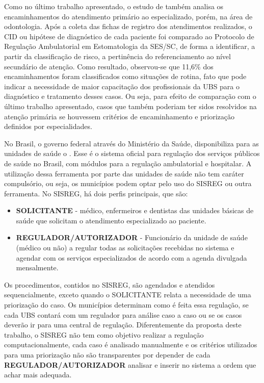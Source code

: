 Como no último trabalho apresentado, o estudo de  também analisa os encaminhamentos do atendimento primário ao especializado, porém, na área de odontologia. Após a coleta das fichas de registro dos atendimentos realizados, o CID ou hipótese de diagnóstico de cada paciente foi comparado ao Protocolo de Regulação Ambulatorial em Estomatologia da SES/SC, de forma a identificar, a partir da classificação de risco, a pertinência do referenciamento ao nível secundário de atenção. Como resultado, observou-se que  11,6\% dos encaminhamentos foram classificados como situações de rotina, fato que pode indicar a necessidade de maior capacitação dos profissionais da UBS para o diagnóstico e tratamento desses casos. Ou seja, para efeito de comparação com o último trabalho apresentado, casos que também poderiam ter sidos resolvidos na atenção primária se houvessem critérios de encaminhamento e priorização definidos por especialidades.

No Brasil, o governo federal através do Ministério da Saúde, disponibiliza para as unidades de saúde o  \cite{SISREG2017}. Esse é o sistema oficial para regulação dos serviços públicos de saúde no Brasil, com módulos para a regulação ambulatorial e hospitalar. A utilização dessa ferramenta por parte das unidades de saúde não tem caráter compulsório, ou seja, os municípios podem optar pelo uso do SISREG ou outra ferramenta.
No SISREG, há dois perfis principais, que são:

\begin{itemize}
    	\item \textbf{SOLICITANTE} - médico, enfermeiros e dentistas das unidades básicas de saúde que solicitam o atendimento especializado ao paciente.
        \item \textbf{REGULADOR/AUTORIZADOR} - Funcionário da unidade de saúde (médico ou não) a regular todas as solicitações recebidas no sistema e agendar com os serviços especializados de acordo com a agenda divulgada mensalmente.
\end{itemize}

Os procedimentos, contidos no SISREG, são agendados e atendidos sequencialmente, exceto quando o SOLICITANTE relata a necessidade de uma priorização do caso.
Os municípios  determinam como é feita essa regulação, se cada UBS contará com um regulador para análise caso a caso ou se os casos deverão ir para uma central de regulação. 
Diferentemente da proposta deste trabalho, o SISREG não tem como objetivo realizar a regulação computacionalmente, cada caso é analisado manualmente e os critérios utilizados para uma priorização não são transparentes por depender de cada \textbf{REGULADOR/AUTORIZADOR} analisar e inserir no sistema a ordem que achar mais adequada.

